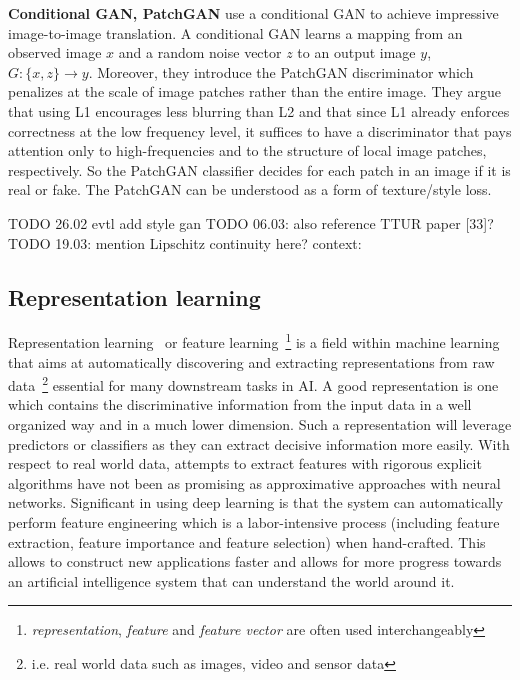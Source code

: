 \documentclass[12pt,a4paper]{article}
\begin{document}
\par \textbf{Conditional GAN, PatchGAN} \cite{CondGAN_PatchGAN} use a conditional GAN to achieve impressive image-to-image translation. A conditional GAN learns a mapping from an observed image $x$ and a random noise vector $z$ to an output image $y$, $G : \{x,z\} \rightarrow y$. Moreover, they introduce the PatchGAN discriminator which penalizes at the scale of image patches rather than the entire image. They argue that using L1 encourages less blurring than L2 and that since L1 already enforces correctness at the low frequency level, it suffices to have a discriminator that pays attention only to high-frequencies and to the structure of local image patches, respectively. So the PatchGAN classifier decides for each patch in an image if it is real or fake. The PatchGAN can be understood as a form of texture/style loss.

TODO 26.02 evtl add style gan
TODO 06.03: also reference TTUR paper [33]?
TODO 19.03: mention Lipschitz continuity here? context:

\subsection{Representation learning}
Representation learning~\cite{ReprLearning} or feature learning~\footnote{\textit{representation}, \textit{feature} and \textit{feature vector} are often used interchangeably} is a field within machine learning that aims at automatically discovering and extracting representations from raw data~\footnote{i.e. real world data such as images, video and sensor data} essential for many downstream tasks in AI. A good representation is one which contains the discriminative information from the input data in a well organized way and in a much lower dimension. Such a representation will leverage predictors or classifiers as they can extract decisive information more easily. With respect to real world data, attempts to extract features with rigorous explicit algorithms have not been as promising as approximative approaches with neural networks. Significant in using deep learning is that the system can automatically perform feature engineering which is a labor-intensive process (including feature extraction, feature importance and feature selection) when hand-crafted. This allows to construct new applications faster and allows for more progress towards an artificial intelligence system that can understand the world around it.  
\end{document}
